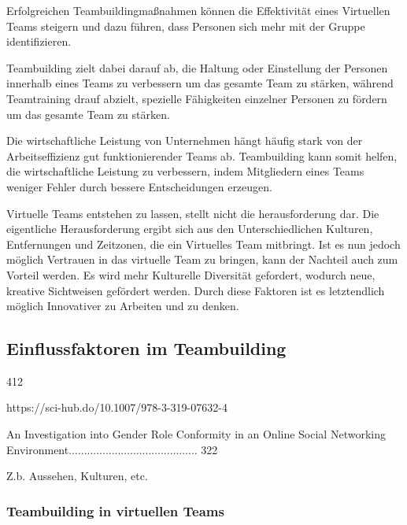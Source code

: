 \documentclass[a4paper,11pt]{article}%
\renewcommand{\\}{\vspace*{0.5\baselineskip} \newline}
\begin{document}
{	Erfolgreichen Teambuildingmaßnahmen können die Effektivität eines Virtuellen Teams steigern und dazu führen, dass Personen sich mehr mit der Gruppe identifizieren. \citep{kaiser2000student}
		
	Teambuilding zielt dabei darauf ab, die Haltung oder Einstellung der Personen innerhalb eines Teams zu verbessern um das gesamte Team zu stärken, während Teamtraining drauf abzielt, spezielle Fähigkeiten einzelner Personen zu fördern um das gesamte Team zu stärken. \citep[p. 367-369]{shuffler2011there}\
		
	Die wirtschaftliche Leistung von Unternehmen hängt häufig stark von der Arbeitseffizienz gut funktionierender Teams ab. Teambuilding kann somit helfen, die wirtschaftliche Leistung zu verbessern, indem Mitgliedern eines Teams weniger Fehler durch bessere Entscheidungen erzeugen. \citep[p. 1-6]{biech2007pfeiffer} 
	
Virtuelle Teams entstehen zu lassen, stellt nicht die herausforderung dar. Die eigentliche Herausforderung ergibt sich aus den Unterschiedlichen Kulturen, Entfernungen und Zeitzonen, die ein Virtuelles Team mitbringt. Ist es nun jedoch möglich Vertrauen in das virtuelle Team zu bringen, kann der Nachteil auch zum Vorteil werden. Es wird mehr Kulturelle Diversität gefordert, wodurch neue, kreative Sichtweisen gefördert werden. Durch diese Faktoren ist es letztendlich möglich Innovativer zu Arbeiten und zu denken. \citep{dyer1995team} \citep[p.405-416]{milliken1996searching}

	\subsection{Einflussfaktoren im Teambuilding}


412

https://sci-hub.do/10.1007/978-3-319-07632-4
	
	
	
An Investigation into Gender Role Conformity in an Online Social
Networking Environment.......................................... 322


	Z.b. Aussehen, Kulturen, etc.	
	
	\subsubsection{Teambuilding in virtuellen Teams}

}
\end{document}
